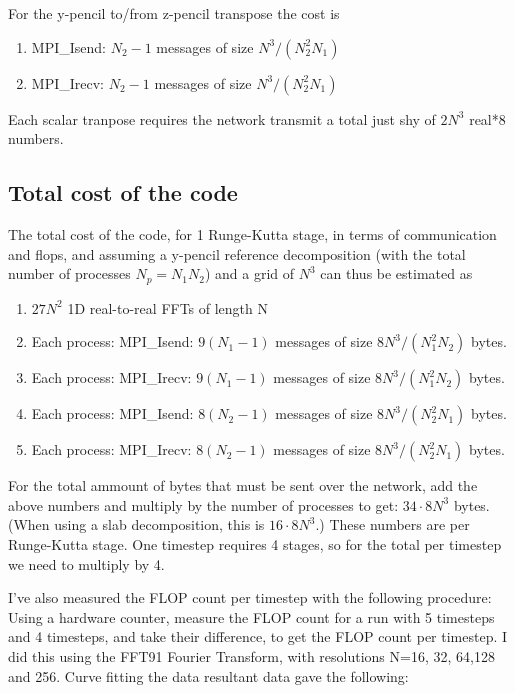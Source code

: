 \documentclass[12pt]{article}
\begin{document}
For the y-pencil to/from z-pencil transpose the cost is
\begin{enumerate}
\item MPI\_Isend:  $N_2 -1$ messages of size $N^3/(N_2^2 N_1)$
\item MPI\_Irecv:  $N_2 -1$ messages of size $N^3/(N_2^2 N_1)$
\end{enumerate}


Each scalar tranpose requires the network transmit a total just
shy of $2N^3$ real*8 numbers.  


\subsection{Total cost of the code}

The total cost of the code, for 1 Runge-Kutta stage,
in terms of communication and flops,
and assuming a y-pencil reference decomposition 
(with the total number of processes $N_p = N_1 N_2$) and a grid of $N^3$
can thus be estimated as

\begin{enumerate}
\item $27N^2$ 1D real-to-real FFTs of length N
\item Each process: MPI\_Isend:  $9(N_1 -1)$ messages of size $8N^3/(N_1^2 N_2)$ bytes.
\item Each process: MPI\_Irecv:  $9(N_1 -1)$ messages of size $8N^3/(N_1^2 N_2)$ bytes.
\item Each process: MPI\_Isend:  $8(N_2 -1)$ messages of size $8N^3/(N_2^2 N_1)$ bytes.
\item Each process: MPI\_Irecv:  $8(N_2 -1)$ messages of size $8N^3/(N_2^2 N_1)$ bytes.
\end{enumerate}

For the total ammount of bytes that must be sent over the network, add
the above numbers and multiply by the number of processes to get: $34
\cdot 8 N^3$ bytes.  (When using a slab decomposition, this is $16
\cdot 8 N^3$.)  These numbers are per Runge-Kutta stage.  One timestep
requires 4 stages, so for the total per timestep we need to multiply
by 4.

I've also measured the FLOP count per timestep with the following
procedure:  Using a hardware counter, measure the FLOP count
for a run with 5 timesteps and 4 timesteps, and take their
difference, to get the FLOP count per timestep.  
I did this using the FFT91 Fourier Transform, with resolutions
N=16, 32, 64,128 and 256.  Curve fitting the data resultant data
gave the following:  
\end{document}
